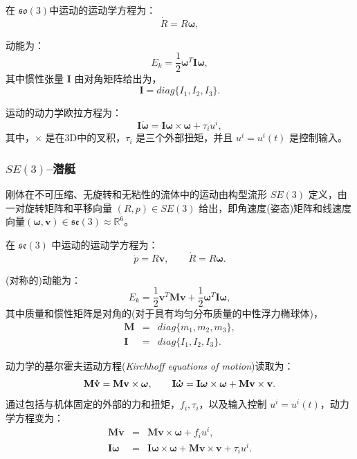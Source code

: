 \documentclass[11pt,fontset=founder]{ctexart}
\begin{document}
在 $\mathfrak{so}(3)$中运动的运动学方程为：
\begin{equation*}
\dot{R}=R\mathbf{\omega},
\end{equation*}

动能为：
\begin{equation*}
E_{k}=\frac{1}{2}\mathbf{\omega }^{T}\mathbf{I\omega },
\end{equation*}
其中惯性张量 $\mathbf{I}$ 由对角矩阵给出为，
\begin{equation*}
\mathbf{I}=diag\{I_{1},I_{2},I_{3}\}.
\end{equation*}

运动的动力学欧拉方程为：
\begin{equation*}
\mathbf{I}\boldsymbol{\dot{\omega}}=\mathbf{I\omega \times \omega } + \tau_iu^i,
\end{equation*}
其中，$\times$ 是在3D中的叉积，$\tau_i$ 是三个外部扭矩，并且 $u^i=u^i(t)$ 是控制输入。

\subsubsection{$SE(3)$–潜艇}

刚体在不可压缩、无旋转和无粘性的流体中的运动由构型流形 $SE(3)$ 定义，由一对旋转矩阵和平移向量 $(R,p)\in SE(3)$ 给出，即角速度(姿态)矩阵和线速度向量$(\mathbf{\omega },\mathbf{v})\in\mathfrak{se}(3)\approx \mathbb{R}^{6}$。\bigskip

在 $\mathfrak{se}(3)$ 中运动的运动学方程为：
\begin{equation*}
\dot{p}=R\mathbf{v},\qquad \dot{R}=R\mathbf{\omega}.
\end{equation*}

(对称的)动能为：
\begin{equation*}
E_{k}=\frac{1}{2}\mathbf{v}^{T}\mathbf{Mv}+\frac{1}{2}\mathbf{\omega }^{T}%
\mathbf{I\omega },
\end{equation*}
其中质量和惯性矩阵是对角的(对于具有均匀分布质量的中性浮力椭球体)，
\begin{eqnarray*}
\mathbf{M} &=&diag\{m_{1},m_{2},m_{3}\}, \\
\mathbf{I} &=&diag\{I_{1},I_{2},I_{3}\}.
\end{eqnarray*}

动力学的基尔霍夫运动方程(\textit{Kirchhoff equations of motion})读取为：
\begin{equation*}
\mathbf{M\dot{v}=Mv\times \omega },\qquad \mathbf{I}\boldsymbol{\dot{\omega}}=\mathbf{%
I\omega \times \omega }+\mathbf{Mv\times v}.
\end{equation*}
通过包括与机体固定的外部的力和扭矩，$f_{i},\tau _{i}$，以及输入控制 $u^{i}=u^{i}(t)$，动力学方程变为：
\begin{eqnarray*}
\mathbf{M\dot{v}} &=&\mathbf{Mv\times \omega }+f_{i}u^{i}, \\
\mathbf{I}\boldsymbol{\dot{\omega}} &=&\mathbf{I\omega \times \omega }+\mathbf{Mv\times v}%
+\tau _{i}u^{i}.
\end{eqnarray*}
\end{document}
